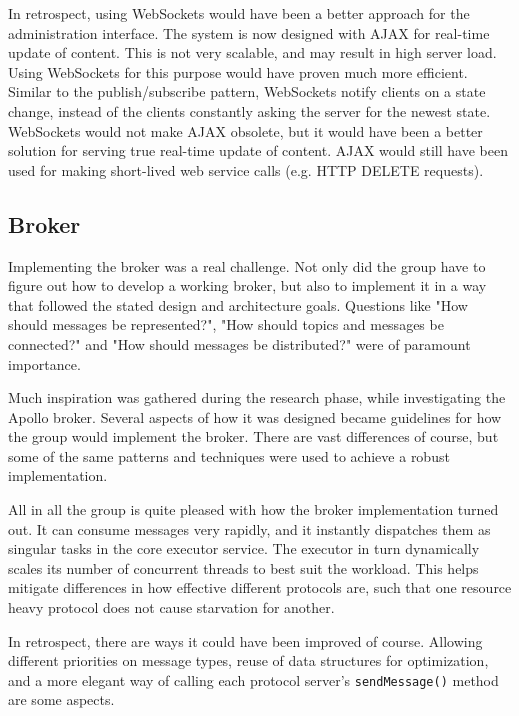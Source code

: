 In retrospect, using WebSockets \cite{web-sockets} would have been a better approach for the administration interface. The system is now designed with AJAX for real-time update of content. This is not very scalable, and may result in high server load. Using WebSockets for this purpose would have proven much more efficient. Similar to the publish/subscribe pattern, WebSockets notify clients on a state change, instead of the clients constantly asking the server for the newest state. WebSockets would not make AJAX obsolete, but it would have been a better solution for serving true real-time update of content. AJAX would still have been used for making short-lived web service calls (e.g. HTTP DELETE requests).

\subsection{Broker}
\label{subsec:Implementation_broker}
Implementing the broker was a real challenge. Not only did the group have to figure out how to develop a working broker, but also to implement it in a way that followed the stated design and architecture goals. Questions like "How should messages be represented?", "How should topics and messages be connected?" and "How should messages be distributed?" were of paramount importance.

Much inspiration was gathered during the research phase, while investigating the Apollo broker. Several aspects of how it was designed became guidelines for how the group would implement the broker. There are vast differences of course, but some of the same patterns and techniques were used to achieve a robust implementation.

All in all the group is quite pleased with how the broker implementation turned out. It can consume messages very rapidly, and it instantly dispatches them as singular tasks in the core executor service. The executor in turn dynamically scales its number of concurrent threads to best suit the workload. This helps mitigate differences in how effective different protocols are, such that one resource heavy protocol does not cause starvation for another.

In retrospect, there are ways it could have been improved of course. Allowing different priorities on message types, reuse of data structures for optimization, and a more elegant way of calling each protocol server's \verb!sendMessage()! method are some aspects.

